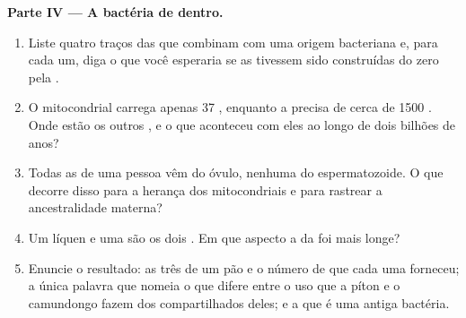 \begin{problem}
\medskip
\noindent\textbf{Parte IV --- A bactéria de dentro.}
\begin{enumerate}[resume]
  \item Liste quatro traços das  que combinam com uma
        origem bacteriana e, para cada um, diga o que você esperaria se
        as  tivessem sido construídas do zero pela .
  \item O  mitocondrial carrega apenas 37 , enquanto a
         precisa de cerca de 1500 . Onde estão os
        outros , e o que aconteceu com eles ao longo de dois
        bilhões de anos?
  \item Todas as  de uma pessoa vêm do óvulo, nenhuma do
        espermatozoide. O que decorre disso para a herança dos 
        mitocondriais e para rastrear a ancestralidade materna?
  \item Um líquen e uma  são os dois . Em que
        aspecto a da  foi mais longe?
  \item Enuncie o resultado: as três  de um pão e o número de
         que cada uma forneceu; a única palavra que nomeia o
        que difere entre o uso que a píton e o camundongo fazem dos
         compartilhados deles; e a  que é uma antiga
        bactéria.
\end{enumerate}
\end{problem}
